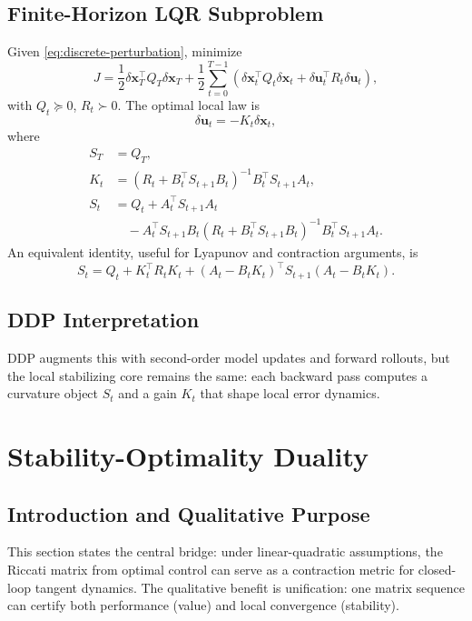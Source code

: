 \documentclass[11pt,letterpaper]{article}
\newcommand{\dx}{\delta\mathbf{x}}
\newcommand{\du}{\delta\mathbf{u}}
\begin{document}
\subsection{Finite-Horizon LQR Subproblem}
Given \eqref{eq:discrete-perturbation}, minimize
\begin{equation}
J = \frac{1}{2}\dx_T^\top Q_T\dx_T
 + \frac{1}{2}\sum_{t=0}^{T-1}
\left(\dx_t^\top Q_t\dx_t + \du_t^\top R_t\du_t\right),
\label{eq:lqr-cost}
\end{equation}
with $Q_t\succeq0$, $R_t\succ0$. The optimal local law is
\begin{equation}
\du_t = -K_t\dx_t,
\label{eq:feedback-law}
\end{equation}
where
\begin{equation}
\begin{aligned}
S_T &= Q_T,\\
K_t &= (R_t + B_t^\top S_{t+1}B_t)^{-1} B_t^\top S_{t+1}A_t,\\
S_t &= Q_t + A_t^\top S_{t+1}A_t \\
&\quad - A_t^\top S_{t+1}B_t(R_t + B_t^\top S_{t+1}B_t)^{-1}B_t^\top S_{t+1}A_t.
\end{aligned}
\label{eq:discrete-riccati}
\end{equation}
An equivalent identity, useful for Lyapunov and contraction arguments, is
\begin{equation}
S_t = Q_t + K_t^\top R_tK_t + (A_t-B_tK_t)^\top S_{t+1}(A_t-B_tK_t).
\label{eq:riccati-equivalent}
\end{equation}

\subsection{DDP Interpretation}
DDP augments this with second-order model updates and forward rollouts, but the local stabilizing core remains the same: each backward pass computes a curvature object $S_t$ and a gain $K_t$ that shape local error dynamics.

\section{Stability-Optimality Duality}

\subsection{Introduction and Qualitative Purpose}
This section states the central bridge: under linear-quadratic assumptions, the Riccati matrix from optimal control can serve as a contraction metric for closed-loop tangent dynamics. The qualitative benefit is unification: one matrix sequence can certify both performance (value) and local convergence (stability).
\end{document}
